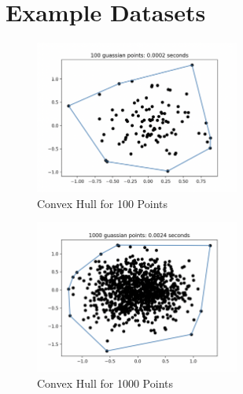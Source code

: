 \documentclass[12pt]{article}
\begin{document}
\section{Example Datasets}
\begin{figure}[h]
    \centering
    \includegraphics[width=0.6\textwidth]{100 points.png}
    \caption{Convex Hull for 100 Points}
    \label{fig:100_points}
\end{figure}

\begin{figure}[h]
    \centering
    \includegraphics[width=0.6\textwidth]{1000 points.png}
    \caption{Convex Hull for 1000 Points}
    \label{fig:1000_points}
\end{figure}
\end{document}
